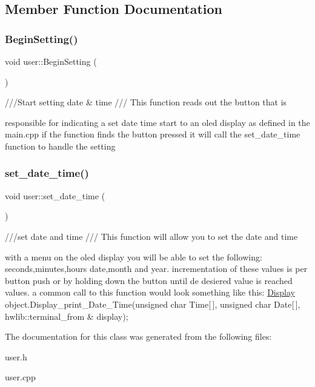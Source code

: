 \subsection{Member Function Documentation}
\mbox{\label{classuser_af17199133dfce25d87d53e716da3c65b}} 
\subsubsection{\texorpdfstring{Begin\+Setting()}{BeginSetting()}}
{\footnotesize\ttfamily void user\+::\+Begin\+Setting (\begin{DoxyParamCaption}{ }\end{DoxyParamCaption})}



///\+Start setting date \& time  /// This function reads out the button that is 

responsible for indicating a set date time start to an oled display as defined in the main.\+cpp if the function finds the button pressed it will call the set\+\_\+date\+\_\+time function to handle the setting \mbox{\label{classuser_ae8ad51951cea1b9675c243bc63c3e7aa}} 
\subsubsection{\texorpdfstring{set\+\_\+date\+\_\+time()}{set\_date\_time()}}
{\footnotesize\ttfamily void user\+::set\+\_\+date\+\_\+time (\begin{DoxyParamCaption}{ }\end{DoxyParamCaption})}



///set date and time  /// This function will allow you to set the date and time 

with a menu on the oled display you will be able to set the following\+: seconds,minutes,hours date,month and year. incrementation of these values is per button push or by holding down the button until de desiered value is reached values. a common call to this function would look something like this\+: \hyperlink{classDisplay}{Display} object.\+Display\+\_\+print\+\_\+\+Date\+\_\+\+Time(unsigned char Time\mbox{[}$\,$\mbox{]}, unsigned char Date\mbox{[}$\,$\mbox{]}, hwlib\+::terminal\+\_\+from \& display); 

The documentation for this class was generated from the following files\+:\begin{DoxyCompactItemize}
\item 
user.\+h\item 
user.\+cpp\end{DoxyCompactItemize}
